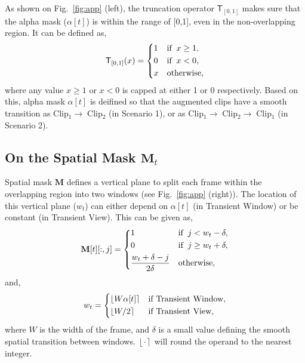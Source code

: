 \documentclass[10pt,twocolumn,letterpaper]{article}
\newcommand{\fref}[1]{Fig.~\ref{#1}}
\newcommand{\round}[1]{\ensuremath{\left\lfloor#1\right\rceil}}
\begin{document}
As shown on \fref{fig:app} (left), the truncation operator $\mathsf{T}_{[0,1]}$ makes sure that the alpha mask ($\alpha[t]$) is within the range of [0,1], even in the non-overlapping region. It can be defined as,
{\small
	\begin{equation*}
		\label{eq:alpha}
		\mathsf{T}_{[0,1]}(x)=
		\begin{dcases}
			1 &\text{if}\;\; x\geq 1,\\
			0 &\text{if}\;\;  x< 0,\\
			x & \text{otherwise},\\
		\end{dcases}  
	\end{equation*}
}%
where any value $x\geq1$ or $x<0$ is capped at either 1 or 0 respectively. Based on this, alpha mask $\alpha[t]$ is deifined so that the augmented clips have a smooth transition as Clip$_1\rightarrow\;$Clip$_2$ (in Scenario 1), or as Clip$_1\rightarrow\;$Clip$_2\rightarrow\;$Clip$_1$ (in Scenario 2).

\subsection{On the Spatial Mask $\mathbf{M}_t$}
\label{app:b}

Spatial mask $\mathbf{M}$ defines a vertical plane to split each frame within the overlapping region into two windows (see \fref{fig:app} (right)). The location of this vertical plane ($w_t$) can either depend on $\alpha[t]$ (in Transient Window) or be constant (in Transient View). This can be given as,
{\small
	\begin{equation*}
		\label{eq:alpha}
		\mathbf{M}[t][:,j]=
		\begin{dcases}
			1 &\text{if}\;\; j < w_t-\delta,\\
			0 &\text{if}\;\; j \geq w_t+\delta ,\\
			\frac{w_t+\delta-j}{2\delta} & \text{otherwise},\\
		\end{dcases}  
	\end{equation*}
}%
and,
{\small
	\begin{equation*}
		\label{eq:alpha}
		w_t=
		\begin{dcases}
			\round{W\alpha[t]} &\text{if Transient Window,}\\
			\round{W/2} &\text{if Transient View,}\\
		\end{dcases}  
	\end{equation*}
}%
where $W$ is the width of the frame, and $\delta$ is a small value defining the smooth spatial transition between windows. $\round{\cdot}$ will round the operand to the nearest integer.

{\small
\balance


}
\end{document}
